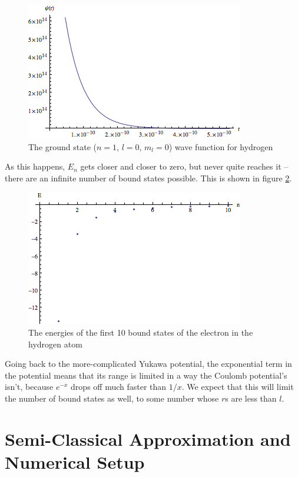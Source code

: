 \documentclass[12pt,twoside]{reedthesis}
\begin{document}
\begin{figure}
\includegraphics[scale=0.75]{hydground.png}
\caption{The ground state ($n=1$, $l =0$, $m_l= 0$) wave function for hydrogen}
\label{fig:hfuncs}
\end{figure}
As this happens, $E_n$ gets closer and closer to zero, but never quite reaches it -- there are an infinite number of bound states possible. This is shown in figure \ref{fig:hspec}.
\begin{figure}[h]
\includegraphics[scale=0.75]{hydrogenspectrum.png}
\caption{The energies of the first 10 bound states of the electron in the hydrogen atom}
\label{fig:hspec}
\end{figure}

Going back to the more-complicated Yukawa potential, the exponential term in the potential means that its range is limited in a way the Coulomb potential's isn't, because $e^{-x}$ drops off much faster than $1/x$. We expect that this will limit the number of bound states as well, to some number whose $r$s are less than $l$.

\clearpage %

\chapter{Semi-Classical Approximation and Numerical Setup}
\end{document}
